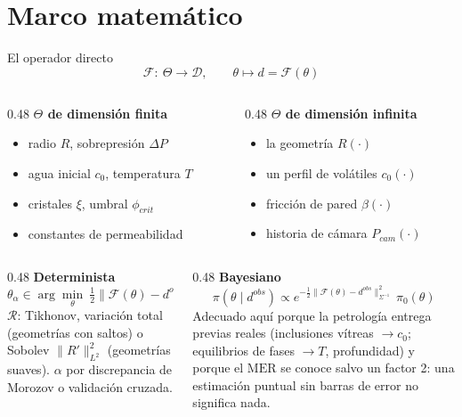 \documentclass[aspectratio=169,10pt,t]{beamer}
\newcommand{\MER}{\mathrm{MER}}
\begin{document}
\section{Marco matemático}

\begin{frame}{El operador directo}
$$\mathcal{F}:\ \Theta\longrightarrow\mathcal{D},\qquad \theta\longmapsto d=\mathcal{F}(\theta)$$

\begin{columns}[T]
\begin{column}{0.48\textwidth}
\textbf{$\Theta$ de dimensión finita}
\begin{itemize}\small
  \item radio $R$, sobrepresión $\Delta P$
  \item agua inicial $c_0$, temperatura $T$
  \item cristales $\xi$, umbral $\phi_{crit}$
  \item constantes de permeabilidad
\end{itemize}
\end{column}
\begin{column}{0.48\textwidth}
\textbf{$\Theta$ de dimensión infinita}
\begin{itemize}\small
  \item la geometría $R(\cdot)$
  \item un perfil de volátiles $c_0(\cdot)$
  \item fricción de pared $\beta(\cdot)$
  \item historia de cámara $P_{cam}(\cdot)$
\end{itemize}
\end{column}
\end{columns}

\vspace{1em}
\begin{columns}[T]
\begin{column}{0.48\textwidth}
\textbf{Determinista}
$$\theta_\alpha\in\arg\min_\theta\ \tfrac12\|\mathcal{F}(\theta)-d^{obs}\|^2_{\Sigma^{-1}}+\alpha\,\mathcal{R}(\theta)$$
\footnotesize $\mathcal{R}$: Tikhonov, variación total (geometrías con saltos)
o Sobolev $\|R'\|^2_{L^2}$ (geometrías suaves). $\alpha$ por discrepancia de
Morozov o validación cruzada.
\end{column}
\begin{column}{0.48\textwidth}
\textbf{Bayesiano}
$$\pi(\theta\mid d^{obs})\propto e^{-\frac12\|\mathcal{F}(\theta)-d^{obs}\|^2_{\Sigma^{-1}}}\ \pi_0(\theta)$$
\footnotesize Adecuado aquí porque la petrología entrega \alert{previas reales}
(inclusiones vítreas $\to c_0$; equilibrios de fases $\to T$, profundidad) y
porque el $\MER$ se conoce \alert{salvo un factor 2}: una estimación puntual sin
barras de error no significa nada.
\end{column}
\end{columns}
\end{frame}
\end{document}
